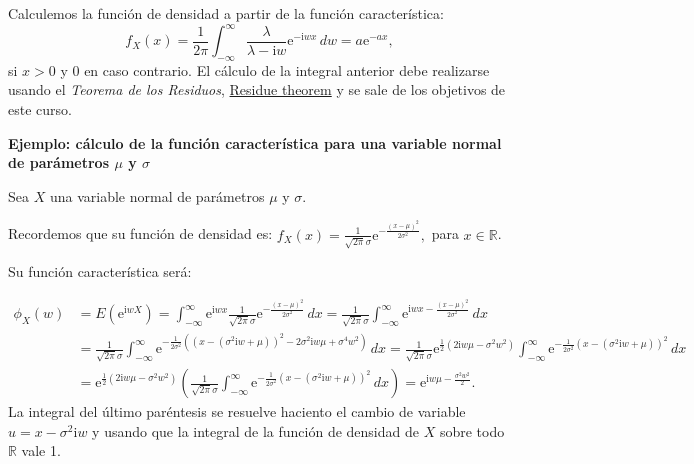 \documentclass[
  letterpaper,
  DIV=11,
  numbers=noendperiod]{scrreprt}
\begin{document}
Calculemos la función de densidad a partir de la función característica:
\[
f_X(x)=\frac{1}{2\pi}\int_{-\infty}^\infty \frac{\lambda}{\lambda -\mathrm{i} w}\mathrm{e}^{-\mathrm{i}wx}\, dw = a\mathrm{e}^{-a x},
\] si \(x>0\) y \(0\) en caso contrario. El cálculo de la integral
anterior debe realizarse usando el \emph{Teorema de los Residuos},
\href{https://en.wikipedia.org/wiki/Residue_theorem}{Residue theorem} y
se sale de los objetivos de este curso.

\textbf{Ejemplo: cálculo de la función característica para una variable
normal de parámetros \(\mu\) y \(\sigma\)}

Sea \(X\) una variable normal de parámetros \(\mu\) y \(\sigma\).

Recordemos que su función de densidad es:
\(f_X(x)=\frac{1}{\sqrt{2\pi}\sigma}\mathrm{e}^{-\frac{(x-\mu)^2}{2\sigma^2}},\)
para \(x\in \mathbb{R}\).

Su función característica será:

\[
\begin{array}{rl}
\phi_X (w) & =\displaystyle E\left(\mathrm{e}^{\mathrm{i}w X}\right)=\int_{-\infty}^\infty \mathrm{e}^{\mathrm{i}w x}\frac{1}{\sqrt{2\pi}\sigma}\mathrm{e}^{-\frac{(x-\mu)^2}{2\sigma^2}}\, dx = \frac{1}{\sqrt{2\pi}\sigma} \int_{-\infty}^\infty \mathrm{e}^{\mathrm{i}wx-\frac{(x-\mu)^2}{2\sigma^2}}\, dx \\[1ex]  & =\displaystyle  \frac{1}{\sqrt{2\pi}\sigma} \int_{-\infty}^\infty \mathrm{e}^{-\frac{1}{2\sigma^2}\left((x-(\sigma^2 \mathrm{i}w+\mu))^2-2\sigma^2 \mathrm{i}w \mu+\sigma^4 w^2\right)}\, dx = \frac{1}{\sqrt{2\pi}\sigma} \mathrm{e}^{\frac{1}{2}(2 \mathrm{i}w \mu -\sigma^2 w^2)}\int_{-\infty}^\infty \mathrm{e}^{-\frac{1}{2\sigma^2}(x-(\sigma^2 \mathrm{i}w+\mu))^2}\, dx\\[1ex] &  = \displaystyle\mathrm{e}^{\frac{1}{2}(2 \mathrm{i}w \mu -\sigma^2 w^2)} \left( \frac{1}{\sqrt{2\pi}\sigma} \int_{-\infty}^\infty \mathrm{e}^{-\frac{1}{2\sigma^2}(x-(\sigma^2 \mathrm{i}w+\mu))^2}\, dx\right) =  \mathrm{e}^{ \mathrm{i}w \mu -\frac{\sigma^2 w^2}{2}}.
\end{array}
\] La integral del último paréntesis se resuelve haciento el cambio de
variable \(u=x-\sigma^2 \mathrm{i}w\) y usando que la integral de la
función de densidad de \(X\) sobre todo \(\mathbb{R}\) vale 1.
\end{document}
